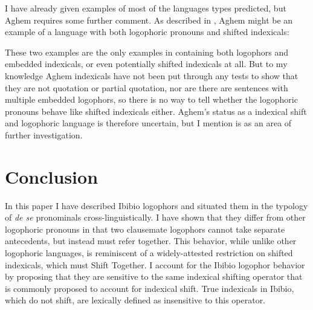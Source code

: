 \documentclass[output=paper]{langscibook}
\begin{document}
I have already given examples of most of the languages types predicted, but Aghem requires some further comment. As described in \citet{Hyman1979}, Aghem might be an example of a language with both logophoric pronouns and shifted indexicals:
\begin{exe}
\ex\label{aghem}
\begin{xlist}%
	
\end{xlist}
\end{exe}
These two examples are the only examples in \citet{Hyman1979} containing both logophors and embedded indexicals, or even potentially shifted indexicals at all. But to my knowledge Aghem indexicals have not been put through any tests to show that they are not quotation or partial quotation, nor are there are sentences with multiple embedded logophors, so there is no way to tell whether the logophoric pronouns behave like shifted indexicals either. Aghem's status as a indexical shift and logophoric language is therefore uncertain, but I mention is as an area of further investigation.


\section{Conclusion}
In this paper I have described Ibibio logophors and situated them in the typology of \textit{de se} pronominals cross-linguistically. I have shown that they differ from other logophoric pronouns in that two clausemate logophors cannot take separate antecedents, but instead must refer together. This behavior, while unlike other logophoric languages, is reminiscent of a widely-attested restriction on shifted indexicals, which must Shift Together. I account for the Ibibio logophor behavior by proposing that they are sensitive to the same indexical shifting operator that is commonly proposed to account for indexical shift. True indexicals in Ibibio, which do not shift, are lexically defined as insensitive to this operator.
 
\end{document}
